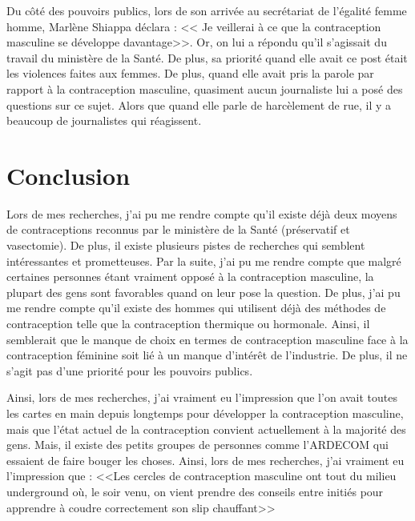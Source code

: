 \documentclass[12pt,a4paper]{report}
\begin{document}
Du côté des pouvoirs publics, lors de son arrivée au secrétariat de l'égalité femme homme, Marlène Shiappa déclara : << Je veillerai à ce que la contraception masculine se développe davantage>>. Or, on lui a répondu qu'il s'agissait du travail du ministère de la Santé. De plus, sa priorité quand elle avait ce post était les violences faites aux femmes. De plus, quand elle avait pris la parole par rapport à la contraception masculine, quasiment aucun journaliste lui a posé des questions sur ce sujet. Alors que quand elle parle de harcèlement de rue, il y a beaucoup de journalistes qui réagissent. \cite{guillaumedaudinContraceptesEnqueteDernier2022}

\chapter*{Conclusion}

Lors de mes recherches, j'ai pu me rendre compte qu'il existe déjà deux moyens de contraceptions reconnus par le ministère de la Santé (préservatif et vasectomie). De plus, il existe plusieurs pistes de recherches qui semblent intéressantes et prometteuses. Par la suite, j'ai pu me rendre compte que malgré certaines personnes étant vraiment opposé à la contraception masculine, la plupart des gens sont favorables quand on leur pose la question. De plus, j'ai pu me rendre compte qu'il existe des hommes qui utilisent déjà des méthodes de contraception telle que la contraception thermique ou hormonale. Ainsi, il semblerait que le manque de choix en termes de contraception masculine face à la contraception féminine soit lié à un manque d'intérêt de l'industrie. De plus, il ne s'agit pas d'une priorité pour les pouvoirs publics. 

Ainsi, lors de mes recherches, j'ai vraiment eu l'impression que l'on avait toutes les cartes en main depuis longtemps pour développer la contraception masculine, mais que l'état actuel de la contraception convient actuellement à la majorité des gens. Mais, il existe des petits groupes de personnes comme l'ARDECOM qui essaient de faire bouger les choses. Ainsi, lors de mes recherches, j'ai vraiment eu l'impression que : <<Les cercles de contraception masculine ont tout du milieu underground où, le soir venu, on vient prendre des conseils entre initiés pour apprendre à coudre correctement son slip chauffant>> \cite{SiContraceptionEtait2021}




\listoffigures
\end{document}
